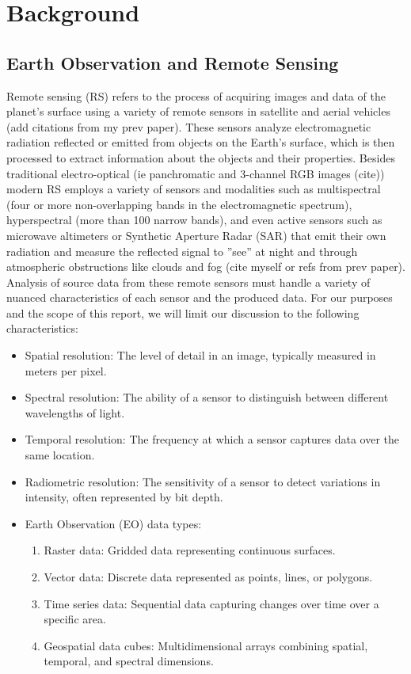\section{Background}

\begin{multicols}{2}

\subsection{Earth Observation and Remote Sensing}

Remote sensing (RS) refers to the process of acquiring images and data of the planet's surface using a variety of remote sensors in satellite and aerial vehicles (add citations from my prev paper). 
These sensors analyze electromagnetic radiation reflected or emitted from objects on the Earth's surface, which is then processed to extract information about the objects and their properties. 
Besides traditional electro-optical (ie panchromatic and 3-channel RGB images (cite)) modern RS employs a variety of sensors and modalities such as multispectral 
(four or more non-overlapping bands in the electromagnetic spectrum), hyperspectral (more than 100 narrow bands), and even active sensors such as microwave altimeters or Synthetic
Aperture Radar (SAR) that emit their own radiation and measure the reflected signal to ”see” at night and through atmospheric obstructions like clouds and fog (cite myself or refs from prev paper). 
Analysis of source data from these remote sensors must handle a variety of nuanced characteristics of each sensor and the produced data. For our purposes and the scope of this report, we will limit our discussion
to the following characteristics: 

\begin{itemize}
    \item Spatial resolution: The level of detail in an image, typically measured in meters per pixel.
    \item Spectral resolution: The ability of a sensor to distinguish between different wavelengths of light.
    \item Temporal resolution: The frequency at which a sensor captures data over the same location.
    \item Radiometric resolution: The sensitivity of a sensor to detect variations in intensity, often represented by bit depth.
    \item Earth Observation (EO) data types:
        \begin{enumerate}
            \item Raster data: Gridded data representing continuous surfaces.
            \item Vector data: Discrete data represented as points, lines, or polygons.
            \item Time series data: Sequential data capturing changes over time over a specific area.
            \item Geospatial data cubes: Multidimensional arrays combining spatial, temporal, and spectral dimensions.
        \end{enumerate}
\end{itemize}


\end{multicols}
